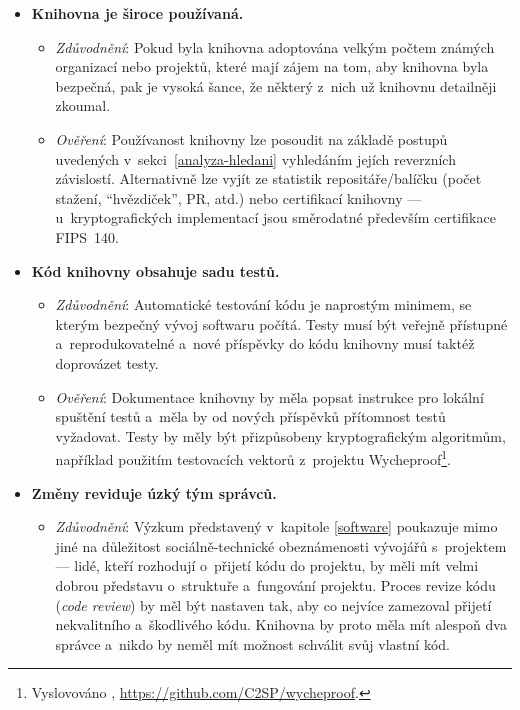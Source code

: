 \begin{itemize}
    \item \textbf{Knihovna je široce používaná.} 
    \begin{itemize}[beginpenalty=10000]
        \item \textit{Zdůvodnění}: Pokud byla knihovna adoptována velkým počtem známých organizací nebo projektů, které mají zájem na tom, aby knihovna byla bezpečná, pak je vysoká šance, že některý z~nich už knihovnu detailněji zkoumal.

        \item \textit{Ověření}: Používanost knihovny lze posoudit na základě postupů uvedených v~sekci~\ref{analyza-hledani} vyhledáním jejích reverzních závislostí. Alternativně lze vyjít ze statistik repositáře/balíčku (počet stažení, ``hvězdiček'', PR, atd.) nebo certifikací knihovny --- u~kryptografických implementací jsou směrodatné především certifikace FIPS~140.
    \end{itemize}

    \item \textbf{Kód knihovny obsahuje sadu testů.} 
    \begin{itemize}[beginpenalty=10000]
        \item \textit{Zdůvodnění}: Automatické testování kódu je naprostým minimem, se kterým bezpečný vývoj softwaru počítá. Testy musí být veřejně přístupné a~reprodukovatelné a~nové pří\-spěv\-ky do kódu knihovny musí taktéž doprovázet testy.

        \item \textit{Ověření}: Dokumentace knihovny by měla popsat instrukce pro lokální spuštění testů a~měla by od nových příspěvků přítomnost testů vyžadovat. Testy by měly být přizpůsobeny kryptografickým algoritmům, například použitím testovacích vektorů z~projektu Wycheproof\footnote{Vyslovováno \textipa{['wItSIpru:f]}, \url{https://github.com/C2SP/wycheproof}.}.
    \end{itemize}

    \item \textbf{Změny reviduje úzký tým správců.} 
    \begin{itemize}[beginpenalty=10000]
        \item \textit{Zdůvodnění}: Výzkum představený v~kapitole \ref{software} poukazuje mimo jiné na důležitost sociálně-technické obeznámenosti vývojářů s~projektem --- lidé, kteří rozhodují o~přijetí kódu do projektu, by měli mít velmi dobrou představu o~struktuře a~fungování projektu. Proces revize kódu (\textit{code review}) by měl být nastaven tak, aby co nejvíce zamezoval přijetí nekvalitního a~škodlivého kódu. Knihovna by proto měla mít alespoň dva správce a~nikdo by neměl mít možnost schválit svůj vlastní kód.


\end{itemize}
\end{itemize}

